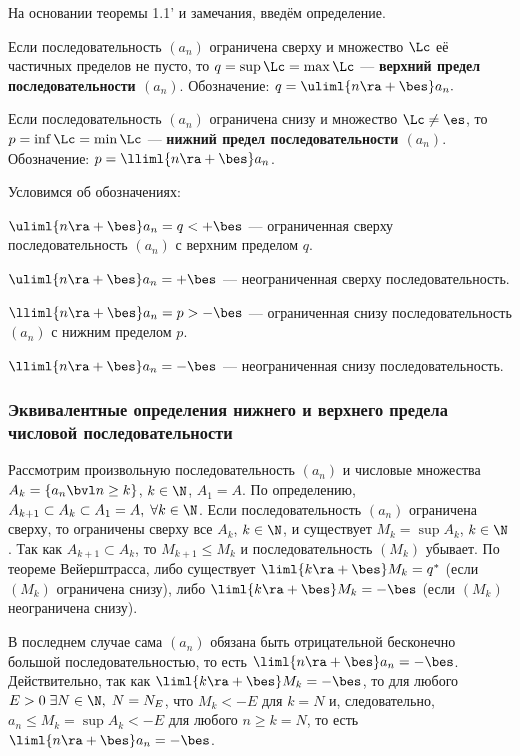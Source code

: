 \documentclass[a4paper]{article}
\begin{document}
На основании теоремы 1.1' и замечания, введём определение.

\begin{df}
Если последовательность $(a_n)$ ограничена сверху и множество $\Lc$
её частичных пределов не пусто, то $q=\sup\Lc=\max\Lc$ ---
\textbf{верхний предел последовательности $(a_n)$}. Обозначение:
$q=\uliml{n\ra+\bes}a_n.$

Если последовательность $(a_n)$ ограничена снизу и множество $\Lc
\ne \es$, то $p=\inf\Lc=\min\Lc$ --- \textbf{нижний предел
последовательности $(a_n)$}. Обозначение: $p=\lliml{n\ra+\bes}a_n$.

\end{df}

Условимся об обозначениях:

$\uliml{n\ra+\bes}a_n = q < +\bes$ --- ограниченная сверху
последовательность $(a_n)$ с верхним пределом $q$.

$\uliml{n\ra+\bes}a_n = +\bes$ --- неограниченная сверху
последовательность.

$\lliml{n\ra+\bes}a_n = p>-\bes$ --- ограниченная снизу
последовательность $(a_n)$ с нижним пределом $p$.

$\lliml{n\ra+\bes}a_n = -\bes$ --- неограниченная снизу
последовательность.

\subsubsection{Эквивалентные определения нижнего и верхнего предела
числовой последовательности}

Рассмотрим произвольную последовательность $(a_n)$ и числовые
множества $A_k=\{a_n \bvl n\ge k\}$, $k\in\N$, $A_1=A$. По
определению, $A_{k+1} \subset A_{k} \subset A_1 = A, \; \forall
k\in\N$. Если последовательность $(a_n)$ ограничена сверху, то
ограничены сверху все $A_k$, $k\in\N$, и существует $M_k=\sup A_k$,
$k\in\N$. Так как $A_{k+1} \subset A_k$, то $M_{k+1} \le M_k$ и
последовательность $(M_k)$ убывает. По теореме Вейерштрасса, либо
существует $\liml{k\ra+\bes}M_k=q^{*}$ (если $(M_k)$ ограничена
снизу), либо $\liml{k\ra+\bes}M_k=-\bes$ (если $(M_k)$ неограничена
снизу).

В последнем случае сама $(a_n)$ обязана быть отрицательной
бесконечно большой последовательностью, то есть
$\liml{n\ra+\bes}a_n=-\bes$. Действительно, так как
$\liml{k\ra+\bes}M_k = -\bes$, то для любого $E>0 \; \exists N\in\N,
\; N=N_E$, что $M_k<-E$ для $k=N$ и, следовательно, $a_n \le
M_k=\sup A_k < -E$ для любого $n\ge k=N$, то есть
$\liml{n\ra+\bes}a_n=-\bes$.
\end{document}
